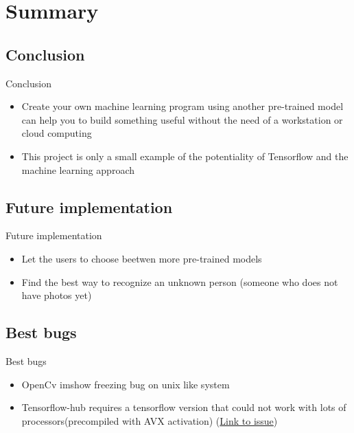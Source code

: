 \documentclass{beamer}
\begin{document}
\section{Summary}

\subsection{Conclusion}
\begin{frame}{Conclusion}
	\begin{itemize}
	\setlength\itemsep{1em}
	[triangle]
	\item 
		Create your own machine learning program using another pre-trained model can help you to build 					something useful without the need of a workstation or cloud computing
	\item 
		This project is only a small example of the potentiality of Tensorflow and the machine learning approach
	\end{itemize}
\end{frame}

\subsection{Future implementation}

\begin{frame}{Future implementation}
	\begin{itemize}
		\setlength\itemsep{1em}
		[triangle]
		\item 
			Let the users to choose beetwen more pre-trained models
		\item 
			Find the best way to recognize an unknown person (someone who does not have photos yet)
	\end{itemize}
\end{frame}

\subsection{Best bugs}

\begin{frame}{Best bugs}
	\begin{itemize}
		\setlength\itemsep{1em}
		[triangle]
		\item 
			OpenCv imshow freezing bug on unix like system
		\item 
			Tensorflow-hub requires a tensorflow version that could not work with lots of 									processors(precompiled with AVX activation)
			(\href{https://github.com/tensorflow/tensorflow/issues/17411}{\color{red}Link to issue})
	\end{itemize}
\end{frame}
\end{document}
